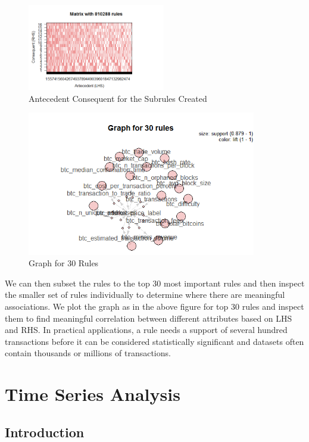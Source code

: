\documentclass{article}
\begin{document}
\begin{figure}[h]
    \centering
    \includegraphics[width=6cm]{AntecedentConsequentFig11.png}
    \caption{Antecedent Consequent for the Subrules Created}
    \label{fig:my_label}
\end{figure}


 \begin{figure}[h]
    \centering
    \includegraphics[width=10cm]{Graphfor30RulesFig12.png}
    \caption{Graph for 30 Rules}
    \label{fig:my_label}
\end{figure}

We can then subset the rules to the top 30 most important rules and then inspect the smaller set of rules individually to determine where there are meaningful associations. We plot the graph as in the above figure for top 30 rules and inspect them to find meaningful correlation between different attributes based on LHS and RHS. In practical applications, a rule needs a support of several hundred transactions before it can be considered statistically significant and datasets often contain thousands or millions of transactions.

\newpage

\section{Time Series Analysis}

\subsection{Introduction}
\end{document}
